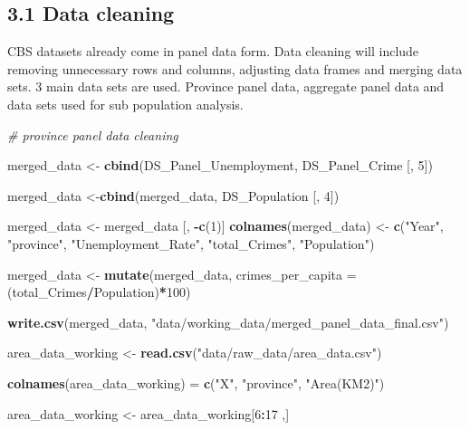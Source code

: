 \documentclass[
]{article}
\newenvironment{Shaded}{\begin{snugshade}}{\end{snugshade}}
\newcommand{\AttributeTok}[1]{\textcolor[rgb]{0.13,0.29,0.53}{#1}}
\newcommand{\CommentTok}[1]{\textcolor[rgb]{0.56,0.35,0.01}{\textit{#1}}}
\newcommand{\DecValTok}[1]{\textcolor[rgb]{0.00,0.00,0.81}{#1}}
\newcommand{\FunctionTok}[1]{\textcolor[rgb]{0.13,0.29,0.53}{\textbf{#1}}}
\newcommand{\NormalTok}[1]{#1}
\newcommand{\OtherTok}[1]{\textcolor[rgb]{0.56,0.35,0.01}{#1}}
\newcommand{\SpecialCharTok}[1]{\textcolor[rgb]{0.81,0.36,0.00}{\textbf{#1}}}
\newcommand{\StringTok}[1]{\textcolor[rgb]{0.31,0.60,0.02}{#1}}
\begin{document}
\subsection{3.1 Data cleaning}\label{data-cleaning}

CBS datasets already come in panel data form. Data cleaning will include
removing unnecessary rows and columns, adjusting data frames and merging
data sets. 3 main data sets are used. Province panel data, aggregate
panel data and data sets used for sub population analysis.

\begin{Shaded}
\begin{Highlighting}[]
\CommentTok{\# province panel data cleaning}

\NormalTok{merged\_data }\OtherTok{\textless{}{-}} \FunctionTok{cbind}\NormalTok{(DS\_Panel\_Unemployment, DS\_Panel\_Crime [, }\DecValTok{5}\NormalTok{])}

\NormalTok{merged\_data }\OtherTok{\textless{}{-}}\FunctionTok{cbind}\NormalTok{(merged\_data, DS\_Population [, }\DecValTok{4}\NormalTok{])}

\NormalTok{merged\_data }\OtherTok{\textless{}{-}}\NormalTok{ merged\_data [, }\SpecialCharTok{{-}}\FunctionTok{c}\NormalTok{(}\DecValTok{1}\NormalTok{)] }
\FunctionTok{colnames}\NormalTok{(merged\_data) }\OtherTok{\textless{}{-}} \FunctionTok{c}\NormalTok{(}\StringTok{"Year"}\NormalTok{, }\StringTok{"province"}\NormalTok{, }\StringTok{"Unemployment\_Rate"}\NormalTok{, }\StringTok{"total\_Crimes"}\NormalTok{, }\StringTok{"Population"}\NormalTok{)}

\NormalTok{merged\_data }\OtherTok{\textless{}{-}} \FunctionTok{mutate}\NormalTok{(merged\_data, }\AttributeTok{crimes\_per\_capita =}\NormalTok{ (total\_Crimes}\SpecialCharTok{/}\NormalTok{Population)}\SpecialCharTok{*}\DecValTok{100}\NormalTok{)}

\FunctionTok{write.csv}\NormalTok{(merged\_data, }\StringTok{"data/working\_data/merged\_panel\_data\_final.csv"}\NormalTok{)}

\NormalTok{area\_data\_working }\OtherTok{\textless{}{-}} \FunctionTok{read.csv}\NormalTok{(}\StringTok{"data/raw\_data/area\_data.csv"}\NormalTok{)}

\FunctionTok{colnames}\NormalTok{(area\_data\_working) }\OtherTok{=} \FunctionTok{c}\NormalTok{(}\StringTok{"X"}\NormalTok{, }\StringTok{"province"}\NormalTok{, }\StringTok{"Area(KM2)"}\NormalTok{)}

\NormalTok{area\_data\_working }\OtherTok{\textless{}{-}}\NormalTok{ area\_data\_working[}\DecValTok{6}\SpecialCharTok{:}\DecValTok{17}\NormalTok{ ,]}


\end{Highlighting}
\end{Shaded}
\end{document}
